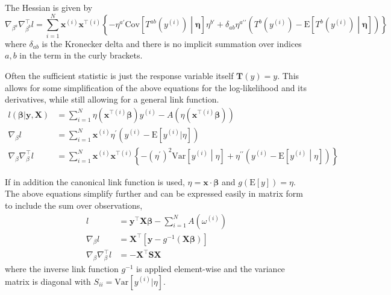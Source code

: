 \documentclass{article}
\newcommand{\bbeta}{\boldsymbol{\beta}}
\begin{document}
The Hessian is given by
\begin{equation}
	\nabla_{\beta^a} \nabla^\intercal_{\beta^b} l = \sum_{i=1}^N \mathbf{x}^{(i)}
	\mathbf{x}^{\intercal(i)} \left\{ - \eta^{a \prime}
	\textrm{Cov}\left[T^{ab}(y^{(i)}) \middle| \boldsymbol{\eta}\right] \eta^{b \prime} +
	\delta_{ab} \eta^{a\prime\prime}\left( T^b (y^{(i)}) -
	\textrm{E}\left[T^b(y^{(i)}) \middle| \boldsymbol{\eta} \right] \right) \right\}
\end{equation}
where \(\delta_{ab}\) is the Kronecker delta and there is no implicit
summation over indices \(a, b\) in the term in the curly brackets.

Often the sufficient statistic is just the response variable itself
\(\mathbf{T}(y) = y\). This allows for some simplification of the above
equations for the log-likelihood and its derivatives, while still allowing for a
general link function.
\begin{align}
	l(\bbeta | \mathbf{y}, \mathbf{X})        & = \sum_{i=1}^N
	\eta(\mathbf{x}^{\intercal(i)} \bbeta) y^{(i)} -
	A\left(\eta(\mathbf{x}^{\intercal(i)} \bbeta) \right)                                                      \\
	\nabla_{\beta} l                          & = \sum_{i=1}^N \mathbf{x}^{(i)} \eta^{\prime} \left( y^{(i)} -
	\textrm{E}[y^{(i)}|\eta] \right)                                                                           \\
	\nabla_{\beta} \nabla^\intercal_{\beta} l & = \sum_{i=1}^N \mathbf{x}^{(i)}
	\mathbf{x}^{\intercal(i)} \left\{ - (\eta^{\prime})^2 \textrm{Var}\left[y^{(i)}
		\middle| \eta\right] + \eta^{\prime\prime}\left( y^{(i)} -
	\textrm{E}\left[y^{(i)} \middle| \eta \right] \right) \right\}
\end{align}

If in addition the canonical link function is used, \(\eta = \mathbf{x} \cdot
\bbeta\) and \(g(\textrm{E}[y]) = \eta\). The above equations
simplify further and can be expressed easily in matrix form to include the sum
over observations,
\begin{align}
	l                                     & = \mathbf{y}^\intercal \mathbf{X} \bbeta - \sum_{i=1}^N
	A\left(\omega^{(i)} \right)                                                                                        \\
	\nabla_\beta l                        & = \mathbf{X}^\intercal \left[ \mathbf{y} - g^{-1}(\mathbf{X}\bbeta)\right] \\
	\nabla_\beta \nabla_\beta^\intercal l & = - \mathbf{X}^\intercal \mathbf{S} \mathbf{X}
\end{align}
where the inverse link function \(g^{-1}\) is applied element-wise and the
variance matrix is diagonal with \(S_{ii} = \textrm{Var}[y^{(i)}|\eta]\).
\end{document}
